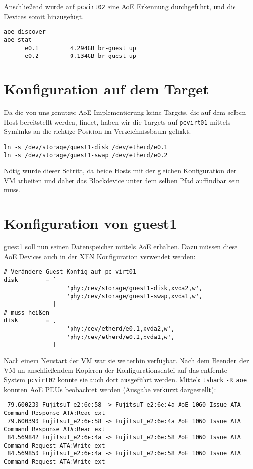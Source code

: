 Anschließend wurde auf \verb#pcvirt02# eine AoE Erkennung durchgeführt, und die Devices somit hinzugefügt.
\setupVerbatimOut
\begin{verbatim}
aoe-discover 
aoe-stat 
      e0.1         4.294GB br-guest up 
      e0.2         0.134GB br-guest up  
\end{verbatim}

\section{Konfiguration auf dem Target}
Da die von uns genutzte AoE-Implementierung keine Targets, die auf dem selben Host bereitstellt werden, findet, haben wir die Targets auf \verb#pcvirt01# mittels Symlinks an die richtige Position im Verzeichnissbaum gelinkt.
\setupVerbatimOut
\begin{verbatim}
ln -s /dev/storage/guest1-disk /dev/etherd/e0.1
ln -s /dev/storage/guest1-swap /dev/etherd/e0.2 
\end{verbatim}

Nötig wurde dieser Schritt, da beide Hosts mit der gleichen Konfiguration der VM arbeiten und daher das Blockdevice unter dem selben Pfad auffindbar sein muss.

\section{Konfiguration von guest1}
guest1 soll nun seinen Datenspeicher mittels AoE erhalten. Dazu müssen diese AoE Devices auch in der XEN Konfiguration verwendet werden:
\setupVerbatimOut
\begin{verbatim}
# Verändere Guest Konfig auf pc-virt01
disk        = [
                  'phy:/dev/storage/guest1-disk,xvda2,w',
                  'phy:/dev/storage/guest1-swap,xvda1,w',
              ]
# muss heißen
disk        = [
                  'phy:/dev/etherd/e0.1,xvda2,w',
                  'phy:/dev/etherd/e0.2,xvda1,w',
              ]
\end{verbatim}

Nach einem Neustart der VM war sie weiterhin verfügbar. Nach dem Beenden der VM un anschließendem Kopieren der Konfigurationsdatei auf das entfernte System \verb#pcvirt02# konnte sie auch dort ausgeführt werden. Mittels \verb#tshark# \verb#-R aoe# konnten AoE PDUs beobachtet werden (Ausgabe verkürzt dargestellt):
\setupVerbatimOut
\begin{verbatim}
 79.600230 FujitsuT_e2:6e:58 -> FujitsuT_e2:6e:4a AoE 1060 Issue ATA Command Response ATA:Read ext
 79.600390 FujitsuT_e2:6e:58 -> FujitsuT_e2:6e:4a AoE 1060 Issue ATA Command Response ATA:Read ext
 84.569842 FujitsuT_e2:6e:4a -> FujitsuT_e2:6e:58 AoE 1060 Issue ATA Command Request ATA:Write ext
 84.569850 FujitsuT_e2:6e:4a -> FujitsuT_e2:6e:58 AoE 1060 Issue ATA Command Request ATA:Write ext
\end{verbatim}

